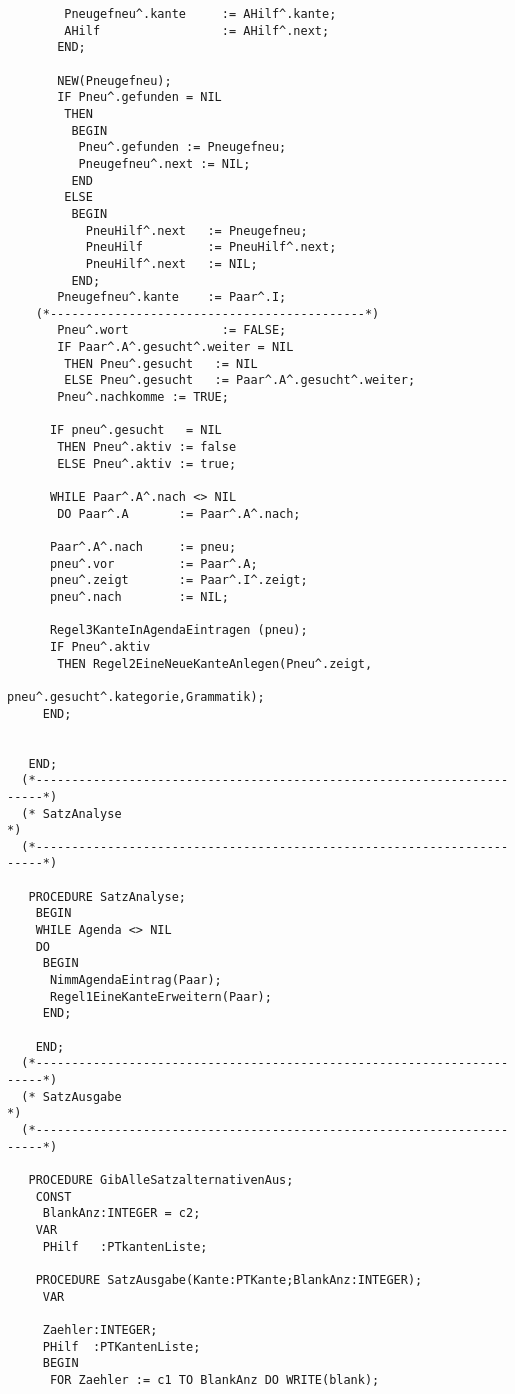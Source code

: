 \documentclass[12pt]{article}
\begin{document}
\begin{verbatim}
        Pneugefneu^.kante     := AHilf^.kante;
        AHilf                 := AHilf^.next;
       END;

       NEW(Pneugefneu);
       IF Pneu^.gefunden = NIL
        THEN
         BEGIN
          Pneu^.gefunden := Pneugefneu;
          Pneugefneu^.next := NIL;
         END
        ELSE
         BEGIN
           PneuHilf^.next   := Pneugefneu;
           PneuHilf         := PneuHilf^.next;
           PneuHilf^.next   := NIL;
         END;
       Pneugefneu^.kante    := Paar^.I;
    (*--------------------------------------------*)
       Pneu^.wort             := FALSE;
       IF Paar^.A^.gesucht^.weiter = NIL
        THEN Pneu^.gesucht   := NIL
        ELSE Pneu^.gesucht   := Paar^.A^.gesucht^.weiter;
       Pneu^.nachkomme := TRUE;

      IF pneu^.gesucht   = NIL
       THEN Pneu^.aktiv := false
       ELSE Pneu^.aktiv := true;

      WHILE Paar^.A^.nach <> NIL
       DO Paar^.A       := Paar^.A^.nach;

      Paar^.A^.nach     := pneu;
      pneu^.vor         := Paar^.A;
      pneu^.zeigt       := Paar^.I^.zeigt;
      pneu^.nach        := NIL;

      Regel3KanteInAgendaEintragen (pneu);
      IF Pneu^.aktiv
       THEN Regel2EineNeueKanteAnlegen(Pneu^.zeigt,
                                     pneu^.gesucht^.kategorie,Grammatik);
     END;


   END;
  (*-----------------------------------------------------------------------*)
  (* SatzAnalyse                                                           *)
  (*-----------------------------------------------------------------------*)

   PROCEDURE SatzAnalyse;
    BEGIN
    WHILE Agenda <> NIL
    DO
     BEGIN
      NimmAgendaEintrag(Paar);
      Regel1EineKanteErweitern(Paar);
     END;

    END;
  (*-----------------------------------------------------------------------*)
  (* SatzAusgabe                                                           *)
  (*-----------------------------------------------------------------------*)

   PROCEDURE GibAlleSatzalternativenAus;
    CONST
     BlankAnz:INTEGER = c2;
    VAR
     PHilf   :PTkantenListe;

    PROCEDURE SatzAusgabe(Kante:PTKante;BlankAnz:INTEGER);
     VAR

     Zaehler:INTEGER;
     PHilf  :PTKantenListe;
     BEGIN
      FOR Zaehler := c1 TO BlankAnz DO WRITE(blank);


\end{verbatim}
\end{document}
